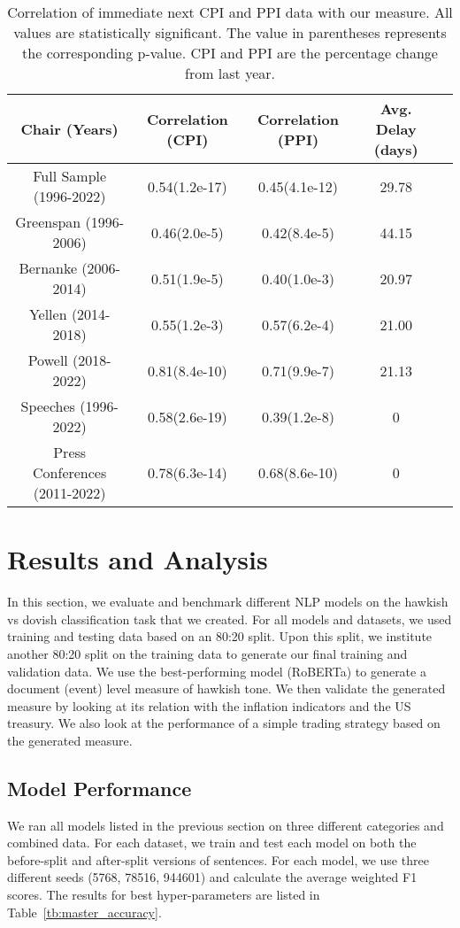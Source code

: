 \documentclass[11pt]{article}
\begin{document}
\begin{table*}[ht]
\centering
\footnotesize
\begin{tabular}{ccccc}
\hline
\textbf{Chair (Years)} & \textbf{Correlation (CPI)} & \textbf{Correlation (PPI)} & \textbf{Avg. Delay (days)}\\
\hline
Full Sample (1996-2022) & 0.54(1.2e-17) & 0.45(4.1e-12) & 29.78\\
\hline
Greenspan (1996-2006) & 0.46(2.0e-5) & 0.42(8.4e-5) & 44.15\\
Bernanke (2006-2014) & 0.51(1.9e-5) & 0.40(1.0e-3) & 20.97\\
Yellen (2014-2018) & 0.55(1.2e-3) & 0.57(6.2e-4) & 21.00\\
Powell (2018-2022) & 0.81(8.4e-10) & 0.71(9.9e-7) & 21.13\\
\hline
Speeches (1996-2022) & 0.58(2.6e-19) & 0.39(1.2e-8) & 0\\
\hline
Press Conferences (2011-2022) & 0.78(6.3e-14) & 0.68(8.6e-10) & 0\\
\hline
\end{tabular}
\caption{Correlation of immediate next CPI and PPI data with our measure. All values are statistically significant. The value in parentheses represents the corresponding p-value. CPI and PPI are the percentage change from last year. }
\label{tb:CPI_PPI_corr}
\end{table*}

\section{Results and Analysis}
In this section, we evaluate and benchmark different NLP models on the hawkish vs dovish classification task that we created. For all models and datasets, we used training and testing data based on an 80:20 split. Upon this split, we institute another 80:20 split on the training data to generate our final training and validation data. We use the best-performing model (RoBERTa) to generate a document (event) level measure of hawkish tone. We then validate the generated measure by looking at its relation with the inflation indicators and the US treasury. We also look at the performance of a simple trading strategy based on the generated measure. 

\subsection{Model Performance}
We ran all models listed in the previous section on three different categories and combined data. For each dataset, we train and test each model on both the before-split and after-split versions of sentences. For each model, we use three different seeds (5768, 78516, 944601) and calculate the average weighted F1 scores. The results for best hyper-parameters are listed in Table~\ref{tb:master_accuracy}. 
\end{document}
